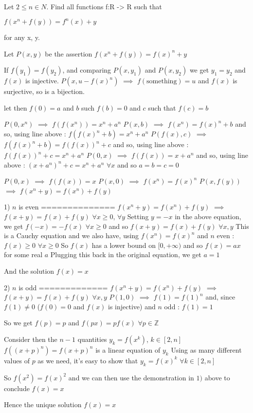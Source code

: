 \begin{solution}
	\begin{tcolorbox}Let $ 2 \le n \in N$. Find all functions f:R -> R such that

$ f(x^n + f(y)) = f^n(x) + y$

for any x, y.\end{tcolorbox}
Let $ P(x,y)$ be the assertion $ f(x^n+f(y))=f(x)^n+y$

If $ f(y_1)=f(y_2)$, and comparing $ P(x,y_1)$ and $ P(x,y_2)$ we get $ y_1=y_2$ and $ f(x)$ is injective.
$ P(x,u-f(x)^n)$ $ \implies$ $ f(\text{something})=u$ and $ f(x)$ is surjective, so is a bijection.

let then $ f(0)=a$ and $ b$ such $ f(b)=0$ and $ c$ such that $ f(c)=b$

$ P(0,x^n)$ $ \implies$ $ f(f(x^n))=x^n+a^n$
$ P(x,b)$ $ \implies$ $ f(x^n)=f(x)^n+b$ and so, using line above : $ f(f(x)^n+b)=x^n+a^n$
$ P(f(x),c)$ $ \implies$ $ f(f(x)^n+b)=f(f(x))^n+c$ and so, using line above : $ f(f(x))^n+c=x^n+a^n$
$ P(0,x)$ $ \implies$ $ f(f(x))=x+a^n$ and so, using line above : $ (x+a^n)^n+c=x^n+a^n$ $ \forall x$ and so $ a=b=c=0$

$ P(0,x)$ $ \implies$ $ f(f(x))=x$
$ P(x,0)$ $ \implies$ $ f(x^n)=f(x)^n$
$ P(x,f(y))$ $ \implies$ $ f(x^n+y)=f(x^n)+f(y)$

1) $ n$ is even
==============
$ f(x^n+y)=f(x^n)+f(y)$ $ \implies$ $ f(x+y)=f(x)+f(y)$ $ \forall x\geq 0$, $ \forall y$
Setting $ y=-x$ in the above equation, we get $ f(-x)=-f(x)$ $ \forall x\ge 0$ and so $ f(x+y)=f(x)+f(y)$ $ \forall x,y$
This is a Cauchy equation and we also have, using $ f(x^n)=f(x)^n$ and $ n$ even : $ f(x)\ge 0$ $ \forall x\ge 0$ 
So $ f(x)$ has a lower bound on $ [0,+\infty)$ and so $ f(x)=ax$ for some real $ a$
Plugging this back in the original equation, we get $ a=1$

And the solution $ f(x)=x$

2) $ n$ is odd
=============
$ f(x^n+y)=f(x^n)+f(y)$ $ \implies$ $ f(x+y)=f(x)+f(y)$ $ \forall x,y$
$ P(1,0)$ $ \implies$  $ f(1)=f(1)^n$ and, since $ f(1)\ne 0$ ($ f(0)=0$ and $ f(x)$ is injective) and $ n$ odd : $ f(1)=1$

So we get $ f(p)=p$ and $ f(px)=pf(x)$  $ \forall p\in\mathbb Z$ 

Consider then the $ n-1$ quantities $ y_k=f(x^k)$, $ k\in[2,n]$
$ f((x+p)^n)=f(x+p)^n$ is a linear equation of $ y_k$ 
Using as many different values of $ p$ as we need, it's easy to show that $ y_k=f(x)^k$ $ \forall k\in[2,n]$

So $ f(x^2)=f(x)^2$ and we can then use the demonstration in $ 1)$ above to conclude $ f(x)=x$


Hence the unique solution $ \boxed{f(x)=x}$
\end{solution}



